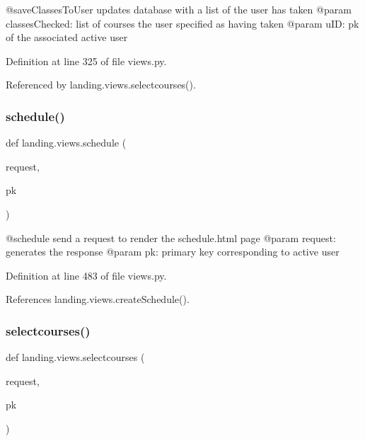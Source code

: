 \begin{DoxyVerb}@saveClassesToUser updates database with a list of the user has taken
@param classesChecked: list of courses the user specified as having taken
@param uID: pk of the associated active user
\end{DoxyVerb}
 

Definition at line 325 of file views.\+py.



Referenced by landing.\+views.\+selectcourses().

\mbox{\label{namespacelanding_1_1views_acbb94e571697e7b28ad35bf2996fe01f}} 
\subsubsection{\texorpdfstring{schedule()}{schedule()}}
{\footnotesize\ttfamily def landing.\+views.\+schedule (\begin{DoxyParamCaption}\item[{}]{request,  }\item[{}]{pk }\end{DoxyParamCaption})}

\begin{DoxyVerb}@schedule send a request to render the schedule.html page
@param request: generates the response
@param pk: primary key corresponding to active user
\end{DoxyVerb}
 

Definition at line 483 of file views.\+py.



References landing.\+views.\+create\+Schedule().

\mbox{\label{namespacelanding_1_1views_a36b36778d06e5903c4854cb15d5ac297}} 
\subsubsection{\texorpdfstring{selectcourses()}{selectcourses()}}
{\footnotesize\ttfamily def landing.\+views.\+selectcourses (\begin{DoxyParamCaption}\item[{}]{request,  }\item[{}]{pk }\end{DoxyParamCaption})}

